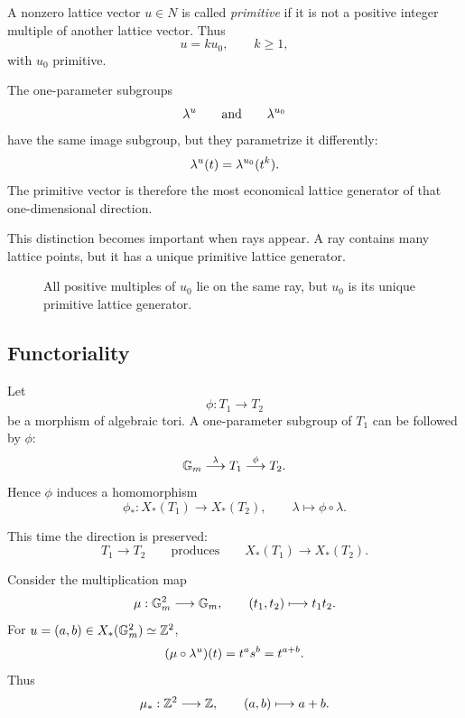 A nonzero lattice vector \(u\in N\) is called \emph{primitive} if it
is not a positive integer multiple of another lattice vector. Thus
\[
u=ku_0,\qquad k\geq1,
\]
with \(u_0\) primitive.

The one-parameter subgroups
\[
\lambda^{u}
\qquad\text{and}\qquad
\lambda^{u_0}
\]
have the same image subgroup, but they parametrize it differently:
\[
\lambda^{u}(t)
=
\lambda^{u_0}(t^k).
\]
The primitive vector is therefore the most economical lattice
generator of that one-dimensional direction.

This distinction becomes important when rays appear. A ray contains
many lattice points, but it has a unique primitive lattice generator.

\begin{figure}[ht]
\centering
{}
\caption{All positive multiples of \(u_0\) lie on the same ray, but
\(u_0\) is its unique primitive lattice generator.}
\label{fig:primitive-generator-ray-preview}
\end{figure}

\subsection{Functoriality}

Let
\[
\phi:T_1\longrightarrow T_2
\]
be a morphism of algebraic tori. A one-parameter subgroup of \(T_1\)
can be followed by \(\phi\):
\[
\mathbb{G}_{m}\overset{\lambda}{\longrightarrow}T_1
\overset{\phi}{\longrightarrow}T_2.
\]
Hence \(\phi\) induces a homomorphism
\[
\phi_*:X_*(T_1)\longrightarrow X_*(T_2),
\qquad
\lambda\longmapsto\phi\circ\lambda.
\]

This time the direction is preserved:
\[
T_1\longrightarrow T_2
\qquad\text{produces}\qquad
X_*(T_1)\longrightarrow X_*(T_2).
\]

\begin{example}
Consider the multiplication map
\[
\mu:\mathbb{G}_{m}^2\longrightarrow\mathbb{G}_{m},
\qquad
(t_1,t_2)\longmapsto t_1t_2.
\]
For \(u=(a,b)\in X_*(\mathbb{G}_{m}^2)\simeq\mathbb{Z}^2\),
\[
(\mu\circ\lambda^{u})(t)
=
t^as^b
=
t^{a+b}.
\]
Thus
\[
\mu_*:\mathbb{Z}^2\longrightarrow\mathbb{Z},
\qquad
(a,b)\longmapsto a+b.
\]
\end{example}

